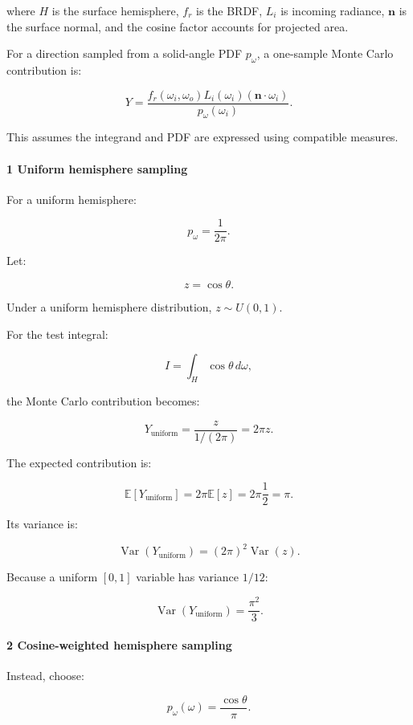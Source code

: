 where \(H\) is the surface hemisphere, \(f_r\) is the BRDF, \(L_i\) is incoming radiance, \(\mathbf n\) is the surface normal, and the cosine factor accounts for projected area.

For a direction sampled from a solid-angle PDF \(p_\omega\), a one-sample Monte Carlo contribution is:

\[
 \boxed{ Y= \frac{ f_r(\omega_i,\omega_o) L_i(\omega_i) (\mathbf n\cdot\omega_i) }{ p_\omega(\omega_i) } }.
\]

This assumes the integrand and PDF are expressed using compatible measures.

\paragraph{1 Uniform hemisphere sampling}\label{uniform-hemisphere-sampling}

For a uniform hemisphere:

\[
 p_\omega=\frac1{2\pi}.
\]

Let:

\[
 z=\cos\theta.
\]

Under a uniform hemisphere distribution, \(z\sim U(0,1)\).

For the test integral:

\[
 I=\int_H\cos\theta\,d\omega,
\]

the Monte Carlo contribution becomes:

\[
 Y_{\mathrm{uniform}} = \frac z{1/(2\pi)} =2\pi z.
\]

The expected contribution is:

\[
 \mathbb E[Y_{\mathrm{uniform}}] = 2\pi\mathbb E[z] =2\pi\frac12 =\pi.
\]

Its variance is:

\[
 \operatorname{Var}(Y_{\mathrm{uniform}}) = (2\pi)^2\operatorname{Var}(z).
\]

Because a uniform \([0,1]\) variable has variance \(1/12\):

\[
 \boxed{ \operatorname{Var}(Y_{\mathrm{uniform}}) = \frac{\pi^2}{3} }.
\]

\paragraph{2 Cosine-weighted hemisphere sampling}\label{cosine-weighted-hemisphere-sampling}

Instead, choose:

\[
 \boxed{ p_\omega(\omega)=\frac{\cos\theta}{\pi} }.
\]

